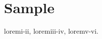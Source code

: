 \documentclass{book}
\begin{document}
\chapter{Sample}

\gls{loremi-ii}, \gls{loremiii-iv}, \gls{loremv-vi}.

\printunsrtglossaries
\end{document}
